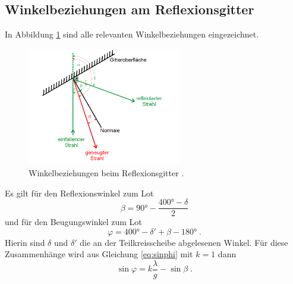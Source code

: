 \subsection{Winkelbeziehungen am Reflexionsgitter}
\label{sec:winkelbeziehungen}
In Abbildung \ref{fig:winkel} sind alle relevanten Winkelbeziehungen eingezeichnet.
\begin{figure}
  \centering
  \includegraphics[width=0.6\textwidth]{ressources/Winkel.png}
  \caption{Winkelbeziehungen beim Reflexionsgitter \cite{skript}.}
  \label{fig:winkel}
\end{figure}
Es gilt für den Reflexionswinkel zum Lot
\begin{equation}
  \beta = 90\si{\degree} - \frac{400\si{\degree} - \delta}{2}
\end{equation}
und für den Beugungswinkel zum Lot
\begin{equation}
  \varphi = 400\si{\degree} - \delta' + \beta - 180 \si{\degree} \; .
\end{equation}
Hierin sind $\delta$ und $\delta'$ die an der Teilkreisscheibe abgelesenen Winkel. Für diese Zusammenhänge wird aus Gleichung \eqref{eq:sinphi} mit $k=1$ dann
\begin{equation}
  \sin{\varphi} = k\frac{\lambda}{g} - \sin{\beta}  \; .
\end{equation}
